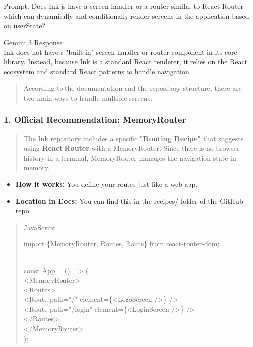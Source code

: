 \documentclass[
]{article}
\begin{document}
Prompt: Does Ink js have a screen handler or a router similar to React
Router which can dynamically and conditionally render screens in the
application based on userState?

Gemini 3 Response:\\
Ink does not have a "built-in" screen handler or router component in its
core library. Instead, because Ink is a standard React renderer, it
relies on the React ecosystem and standard React patterns to handle
navigation.

\begin{quote}
According to the documentation and the repository structure, there are
two main ways to handle multiple screens:
\end{quote}

\hypertarget{official-recommendation-memoryrouter}{%
\subsubsection{\texorpdfstring{\textbf{1. Official Recommendation:
MemoryRouter}}{1. Official Recommendation: MemoryRouter}}\label{official-recommendation-memoryrouter}}

\begin{quote}
The Ink repository includes a specific \textbf{"Routing Recipe"} that
suggests using \textbf{React Router} with a MemoryRouter. Since there is
no browser history in a terminal, MemoryRouter manages the navigation
state in memory.
\end{quote}

\begin{itemize}
\item
  \textbf{How it works:} You define your routes just like a web app.
\item
  \textbf{Location in Docs:} You can find this in the recipes/ folder of
  the GitHub repo.
\end{itemize}

\begin{quote}
JavaScript

import \{MemoryRouter, Routes, Route\} from
\textquotesingle react-router-dom\textquotesingle;\\
\strut \\
const App = () =\textgreater{} (\\
\textless MemoryRouter\textgreater{}\\
\textless Routes\textgreater{}\\
\textless Route path="/" element=\{\textless LogoScreen /\textgreater\}
/\textgreater{}\\
\textless Route path="/login" element=\{\textless LoginScreen
/\textgreater\} /\textgreater{}\\
\textless/Routes\textgreater{}\\
\textless/MemoryRouter\textgreater{}\\
);
\end{quote}
\end{document}
